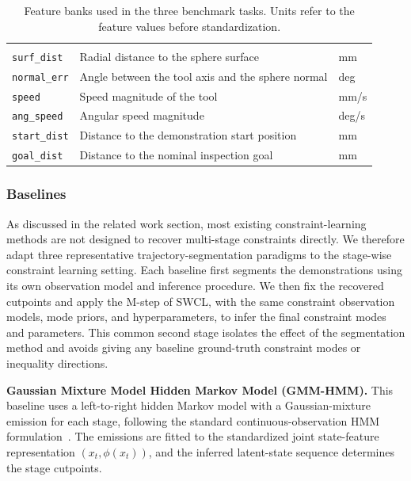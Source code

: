 \documentclass[lettersize,journal]{IEEEtran}
\begin{document}
\begin{table}[t]
\begin{tabularx}{\columnwidth}{
@{}
>{\raggedright\arraybackslash}p{2.05cm}
>{\raggedright\arraybackslash}X
>{\centering\arraybackslash}p{0.75cm}
@{}
}
\addlinespace[0.25em]
\midrule
\addlinespace[0.1em]

\multicolumn{3}{@{}l}{\textbf{\texttt{S5SphereInspect}}} \\
\addlinespace[0.1em]
\texttt{surf\_dist}
& Radial distance to the sphere surface
& mm \\

\texttt{normal\_err}
& Angle between the tool axis and the sphere normal
& deg \\

\texttt{speed}
& Speed magnitude of the tool
& mm/s \\

\texttt{ang\_speed}
& Angular speed magnitude
& deg/s \\

\texttt{start\_dist}
& Distance to the demonstration start position
& mm \\

\texttt{goal\_dist}
& Distance to the nominal inspection goal
& mm \\

\bottomrule
\end{tabularx}

\caption{
Feature banks used in the three benchmark tasks.
Units refer to the feature values before standardization.
}
\label{tab:dataset_features}
\end{table}

\subsubsection{Baselines}
As discussed in the related work section, most existing constraint-learning methods are not designed to recover multi-stage constraints directly. We therefore adapt three representative trajectory-segmentation paradigms to the stage-wise constraint learning setting. Each baseline first segments the demonstrations using its own observation model and inference procedure. We then fix the recovered cutpoints and apply the M-step of SWCL, with the same constraint observation models, mode priors, and hyperparameters, to infer the final constraint modes and parameters. This common second stage isolates the effect of the segmentation method and avoids giving any baseline ground-truth constraint modes or inequality directions.

\textbf{Gaussian Mixture Model Hidden Markov Model (GMM-HMM).}
This baseline uses a left-to-right hidden Markov model with a Gaussian-mixture emission for each stage, following the standard continuous-observation HMM formulation~\cite{rabiner1989hmm}. The emissions are fitted to the standardized joint state-feature representation $(x_t,\phi(x_t))$, and the inferred latent-state sequence determines the stage cutpoints.
\end{document}
